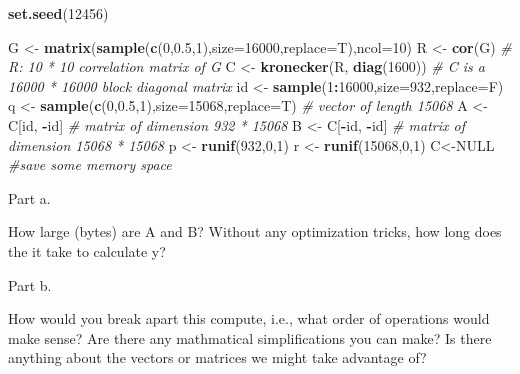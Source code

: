 \documentclass[]{article}
\newenvironment{Shaded}{\begin{snugshade}}{\end{snugshade}}
\newcommand{\CommentTok}[1]{\textcolor[rgb]{0.56,0.35,0.01}{\textit{#1}}}
\newcommand{\DataTypeTok}[1]{\textcolor[rgb]{0.13,0.29,0.53}{#1}}
\newcommand{\DecValTok}[1]{\textcolor[rgb]{0.00,0.00,0.81}{#1}}
\newcommand{\FloatTok}[1]{\textcolor[rgb]{0.00,0.00,0.81}{#1}}
\newcommand{\KeywordTok}[1]{\textcolor[rgb]{0.13,0.29,0.53}{\textbf{#1}}}
\newcommand{\NormalTok}[1]{#1}
\newcommand{\OperatorTok}[1]{\textcolor[rgb]{0.81,0.36,0.00}{\textbf{#1}}}
\newcommand{\OtherTok}[1]{\textcolor[rgb]{0.56,0.35,0.01}{#1}}
\newcommand{\StringTok}[1]{\textcolor[rgb]{0.31,0.60,0.02}{#1}}
\begin{document}
\begin{Shaded}
\begin{Highlighting}[]
    \KeywordTok{set.seed}\NormalTok{(}\DecValTok{12456}\NormalTok{) }
    
\NormalTok{    G <-}\StringTok{ }\KeywordTok{matrix}\NormalTok{(}\KeywordTok{sample}\NormalTok{(}\KeywordTok{c}\NormalTok{(}\DecValTok{0}\NormalTok{,}\FloatTok{0.5}\NormalTok{,}\DecValTok{1}\NormalTok{),}\DataTypeTok{size=}\DecValTok{16000}\NormalTok{,}\DataTypeTok{replace=}\NormalTok{T),}\DataTypeTok{ncol=}\DecValTok{10}\NormalTok{)}
\NormalTok{    R <-}\StringTok{ }\KeywordTok{cor}\NormalTok{(G) }\CommentTok{# R: 10 * 10 correlation matrix of G}
\NormalTok{    C <-}\StringTok{ }\KeywordTok{kronecker}\NormalTok{(R, }\KeywordTok{diag}\NormalTok{(}\DecValTok{1600}\NormalTok{)) }\CommentTok{# C is a 16000 * 16000 block diagonal matrix}
\NormalTok{    id <-}\StringTok{ }\KeywordTok{sample}\NormalTok{(}\DecValTok{1}\OperatorTok{:}\DecValTok{16000}\NormalTok{,}\DataTypeTok{size=}\DecValTok{932}\NormalTok{,}\DataTypeTok{replace=}\NormalTok{F)}
\NormalTok{    q <-}\StringTok{ }\KeywordTok{sample}\NormalTok{(}\KeywordTok{c}\NormalTok{(}\DecValTok{0}\NormalTok{,}\FloatTok{0.5}\NormalTok{,}\DecValTok{1}\NormalTok{),}\DataTypeTok{size=}\DecValTok{15068}\NormalTok{,}\DataTypeTok{replace=}\NormalTok{T) }\CommentTok{# vector of length 15068}
\NormalTok{    A <-}\StringTok{ }\NormalTok{C[id, }\OperatorTok{-}\NormalTok{id] }\CommentTok{# matrix of dimension 932 * 15068}
\NormalTok{    B <-}\StringTok{ }\NormalTok{C[}\OperatorTok{-}\NormalTok{id, }\OperatorTok{-}\NormalTok{id] }\CommentTok{# matrix of dimension 15068 * 15068}
\NormalTok{    p <-}\StringTok{ }\KeywordTok{runif}\NormalTok{(}\DecValTok{932}\NormalTok{,}\DecValTok{0}\NormalTok{,}\DecValTok{1}\NormalTok{)}
\NormalTok{    r <-}\StringTok{ }\KeywordTok{runif}\NormalTok{(}\DecValTok{15068}\NormalTok{,}\DecValTok{0}\NormalTok{,}\DecValTok{1}\NormalTok{)}
\NormalTok{    C<-}\OtherTok{NULL} \CommentTok{#save some memory space}
\end{Highlighting}
\end{Shaded}

Part a.

How large (bytes) are A and B? Without any optimization tricks, how long
does the it take to calculate y?

Part b.

How would you break apart this compute, i.e., what order of operations
would make sense? Are there any mathmatical simplifications you can
make? Is there anything about the vectors or matrices we might take
advantage of?
\end{document}

